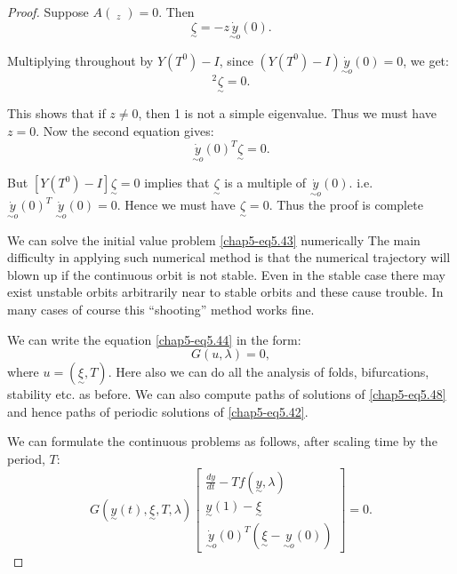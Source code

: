 \begin{proof}%
Suppose $A \left(\displaystyle{\mathop{\underset{\sim}{\zeta}}_z}
\right)=0$. Then   
\begin{equation*}
[Y(T^0)-I]\underset{\sim}{\zeta} =- z \underset{\sim o}{\dot{y}}
(0). \tag{5.47a}\label{chap5-eq5.47a} 
\end{equation*}

  Multiplying throughout by $Y(T^0)-I$, since $(Y(T^0)-I)
\underset{\sim o}{\dot{y}}(0)=0$, we get: 
  \begin{equation*}
[Y (T^0)-I]^2 \underset{\sim}{\zeta} =0. \tag{5.47b}\label{chap5-eq5.47b}
  \end{equation*}  

  This shows that if $z \neq 0$, then 1 is not a simple
  eigenvalue. Thus we must have $z=0$. Now the second equation gives: 
  $$
  \underset{\sim o}{\dot{y}} (0)^T \underset{\sim}{\zeta}=0.
  $$ 
  
  But $[Y(T^0)-I]\underset{\sim}{\zeta} =0$ implies that
  $\underset{\sim}{\zeta}$ is a multiple of $\underset{\sim
    o}{\dot{y}}(0)$. i.e. $\underset{\sim
      o}{\dot{y}}(0)^T \; \underset{\sim o}{\dot{y}}(0)=0$. Hence
  we must have  $\underset{\sim}{\zeta}=0$. Thus the proof is complete   
  
  We can solve the initial value problem \eqref{chap5-eq5.43}
  numerically The main 
  difficulty in applying such numerical method is that the numerical
  trajectory will blown up if the continuous orbit is not stable. Even
  in the stable case there may exist unstable orbits arbitrarily near
  to stable orbits and these cause trouble. In many cases of course
  this ``shooting'' method works fine. 
  
  We can write the equation \eqref{chap5-eq5.44} in the form: 
  \begin{equation*}
G(u,\lambda )=0, \tag{5.48}\label{chap5-eq5.48}
  \end{equation*}\pageoriginale
  where $u= (\underset{\sim}{\xi}, T)$. Here also we can do all the
  analysis of folds, bifurcations, stability etc. as before. We can
  also compute paths of solutions of \eqref{chap5-eq5.48} and hence paths of
  periodic solutions of \eqref{chap5-eq5.42}. 
  
  We can formulate the continuous problems as follows, after scaling
  time by the period, $T$: 
  \begin{equation*}
G(\underset{\sim}{y}(t),\underset{\sim}{\xi}, T, \lambda
) \begin{bmatrix} \frac{dy}{dt}-Tf(\underset{\sim}{y}, \lambda
  )\\\underset{\sim}{y}(1) -\underset{\sim}{\xi} \\ \underset{\sim
    o}{\dot{y}}(0)^T (\underset{\sim}{\xi}- \underset{\sim
    o}{y}(0))\end{bmatrix} =0.  \tag{5.49}\label{chap5-eq5.49} 
  \end{equation*}
  

\end{proof}
